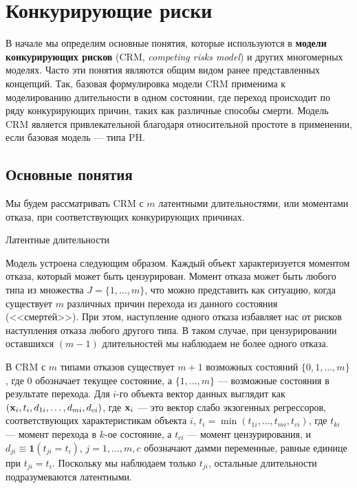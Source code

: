 \section{Конкурирующие риски}\label{sec:19.2}

\noindent
В начале мы определим основные понятия, которые используются в \textbf{модели конкурирующих рисков} (CRM, \textit{competing risks model}) и других многомерных моделях. Часто эти понятия являются общим видом ранее представленных концепций.  Так, базовая формулировка модели CRM применима к моделированию длительности в одном состоянии, где переход происходит по ряду конкурирующих причин, таких как различные способы смерти. Модель CRM является привлекательной благодаря относительной простоте в применении, если базовая модель --- типа PH.


\subsection{Основные понятия}\label{sec:19.2.1}

\noindent
Мы будем рассматривать CRM с $m$ латентными длительностями, или моментами отказа, при соответствующих конкурирующих причинах.

        \begin{center}Латентные длительности\end{center}
        \noindent
Модель устроена следующим образом. Каждый объект характеризуется моментом отказа, который может быть цензурирован. Момент отказа может быть любого типа из множества $J = \{1, \ldots , m\}$, что можно представить как ситуацию, когда существует $m$ различных причин перехода из данного состояния (<<смертей>>). При этом, наступление одного отказа избавляет нас от рисков наступления отказа любого другого типа. В таком случае, при цензурировании оставшихся $(m-1)$ длительностей мы наблюдаем не более одного отказа.

В CRM с $m$ типами отказов существует $m + 1$ возможных состояний $\{0, 1, \ldots , m\}$, где 0 обозначает текущее состояние, а $\{1, \ldots , m\}$ --- возможные состояния в результате перехода. Для $i$-го объекта вектор данных выглядит как $(\mathbf{x}_i, t_i, d_{1i}, \ldots , d_{mi}, d_{ci})$, где $\mathbf{x}_i$ --- это вектор слабо экзогенных регрессоров, соответствующих характеристикам объекта $i$, $t_i = \min(t_{1i}, \ldots , t_{mi}, t_{ci})$, где $t_{ki}$ --- момент перехода в $k$-ое состояние, а $t_{ci}$ --- момент цензурирования, и $d_{ji} \equiv \textbf{1}(t_{ji} = t_i)$, $j = 1, \ldots , m, c$ обозначают дамми переменные, равные единице при $t_{ji} = t_i$. Поскольку мы наблюдаем только $t_{ji}$, остальные длительности подразумеваются латентными.

